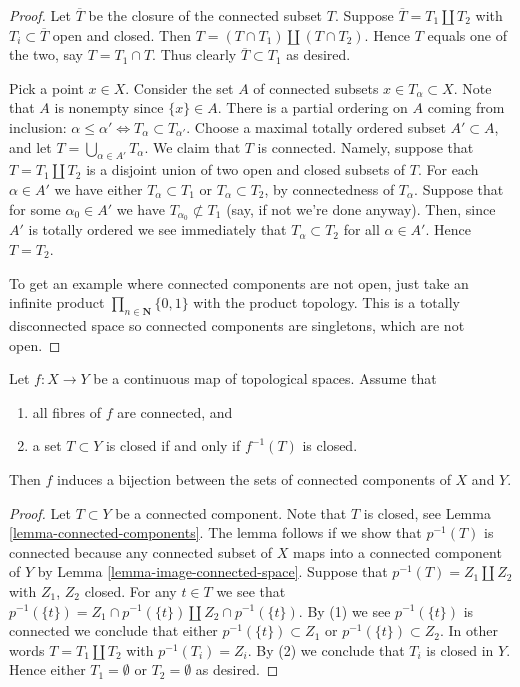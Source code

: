 \begin{proof}
Let $\overline{T}$ be the closure of the connected subset $T$.
Suppose $\overline{T} = T_1 \coprod T_2$ with $T_i \subset \overline{T}$
open and closed. Then $T = (T\cap T_1) \coprod (T \cap T_2)$. Hence
$T$ equals one of the two, say $T = T_1 \cap T$. Thus clearly
$\overline{T} \subset T_1$ as desired.

\medskip\noindent
Pick a point $x\in X$. Consider the set $A$ of connected subsets
$x \in T_\alpha \subset X$. Note that $A$ is nonempty since
$\{x\} \in A$. There is a partial ordering on $A$ coming from
inclusion: $\alpha \leq \alpha' \Leftrightarrow T_\alpha \subset T_{\alpha'}$.
Choose a maximal totally ordered subset $A' \subset A$, and let
$T = \bigcup_{\alpha \in A'} T_\alpha$. We claim that $T$ is
connected. Namely, suppose that $T =  T_1 \coprod T_2$ is a disjoint
union of two open and closed subsets of $T$.
For each $\alpha \in A'$ we have either $T_\alpha \subset T_1$
or $T_\alpha \subset T_2$, by connectedness of $T_\alpha$.
Suppose that for some $\alpha_0 \in A'$ we have
$T_{\alpha_0} \not\subset T_1$ (say, if not we're done anyway).
Then, since $A'$ is totally ordered we see immediately that
$T_\alpha \subset T_2$ for all $\alpha \in A'$. Hence $T = T_2$.

\medskip\noindent
To get an example
where connected components are not open, just take
an infinite product $\prod_{n \in \mathbf{N}} \{0, 1\}$
with the product topology. This is a totally disconnected
space so connected components are singletons, which are
not open.
\end{proof}

\begin{lemma}
\label{lemma-connected-fibres-quotient-topology-connected-components}
Let $f : X \to Y$ be a continuous map of topological spaces.
Assume that
\begin{enumerate}
\item all fibres of $f$ are connected, and
\item a set $T \subset Y$ is closed if and only if $f^{-1}(T)$ is closed.
\end{enumerate}
Then $f$ induces a bijection between the sets of connected
components of $X$ and $Y$.
\end{lemma}

\begin{proof}
Let $T \subset Y$ be a connected component.
Note that $T$ is closed, see Lemma \ref{lemma-connected-components}.
The lemma follows if we show that $p^{-1}(T)$ is connected
because any connected subset of $X$ maps into a connected component
of $Y$ by Lemma \ref{lemma-image-connected-space}.
Suppose that $p^{-1}(T) = Z_1 \coprod Z_2$
with $Z_1$, $Z_2$ closed. For any $t \in T$ we see that
$p^{-1}(\{t\}) = Z_1 \cap p^{-1}(\{t\}) \coprod Z_2 \cap p^{-1}(\{t\})$.
By (1) we see $p^{-1}(\{t\})$ is connected we conclude that
either $p^{-1}(\{t\}) \subset Z_1$ or $p^{-1}(\{t\}) \subset Z_2$.
In other words $T = T_1 \coprod T_2$ with $p^{-1}(T_i) = Z_i$.
By (2) we conclude that $T_i$ is closed in $Y$.
Hence either $T_1 = \emptyset$ or $T_2 = \emptyset$ as desired.
\end{proof}

